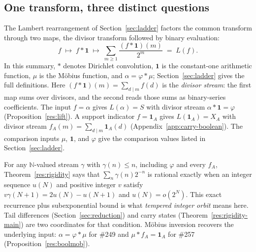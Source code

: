 \documentclass[11pt]{article}
\theoremstyle{definition}
\theoremstyle{remark}
\newcommand{\N}{\mathbb{N}}
\newcommand{\ph}{\varphi}
\begin{document}
\subsection{One transform, three distinct questions}
\label{sec:one-transform}

The Lambert rearrangement of Section~\ref{sec:ladder} factors the common
transform through two maps, the divisor transform followed by binary
evaluation:
\[
 f\;\longmapsto\;f*\mathbf 1\;\longmapsto\;
 \sum_{m\ge1}\frac{(f*\mathbf 1)(m)}{2^m}\;=\;L(f).
\]
In this summary, \(*\) denotes Dirichlet convolution,
\(\mathbf 1\) is the constant-one arithmetic function, \(\mu\) is the
M\"obius function, and \(\alpha=\ph*\mu\); Section~\ref{sec:ladder} gives
the full definitions.
Here \((f*\mathbf 1)(m)=\sum_{d\mid m}f(d)\) is the \emph{divisor stream}:
the first map sums over divisors, and the second reads those sums as
binary-series coefficients.  The input \(f=\alpha\) gives
\(L(\alpha)=S\) with divisor stream \(\alpha*\mathbf 1=\ph\)
(Proposition~\ref{res:lift}).  A support indicator \(f=\mathbf 1_A\) gives
\(L(\mathbf 1_A)=X_A\) with divisor stream
\(f_A(m)=\sum_{d\mid m}\mathbf 1_A(d)\)
(Appendix~\ref{app:carry-boolean}).  The comparison inputs
\(\mu\), \(\mathbf 1\), and \(\ph\) give the comparison values listed in
Section~\ref{sec:ladder}.

For any \(\N\)-valued stream \(\gamma\) with \(\gamma(n)\le n\), including
\(\ph\) and every \(f_A\), Theorem~\ref{res:rigidity} says that
\(\sum_n\gamma(n)2^{-n}\) is rational exactly when an integer sequence
\(u(N)\) and positive integer $v$ satisfy
\(v\gamma(N+1)=2u(N)-u(N+1)\) and \(u(N)=o(2^N)\).  This exact recurrence
plus subexponential bound is what \emph{tempered integer orbit} means here.
Tail differences (Section~\ref{sec:reduction}) and carry states
(Theorem~\ref{res:rigidity-main}) are two coordinates for that condition.
M\"obius inversion recovers the underlying input: \(\alpha=\ph*\mu\) for
\#249 and \(\mu*f_A=\mathbf 1_A\) for \#257
(Proposition~\ref{res:boolmob}).
\end{document}

